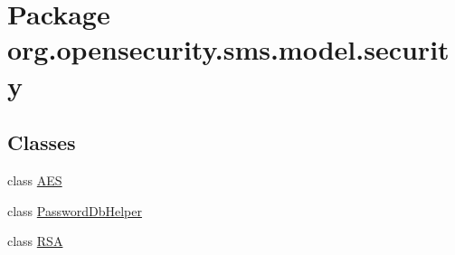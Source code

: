 \hypertarget{a00039}{\section{Package org.\+opensecurity.\+sms.\+model.\+security}
\label{a00039}
}
\subsection*{Classes}
\begin{DoxyCompactItemize}
\item 
class \hyperlink{a00001}{A\+E\+S}
\item 
class \hyperlink{a00011}{Password\+Db\+Helper}
\item 
class \hyperlink{a00013}{R\+S\+A}
\end{DoxyCompactItemize}
